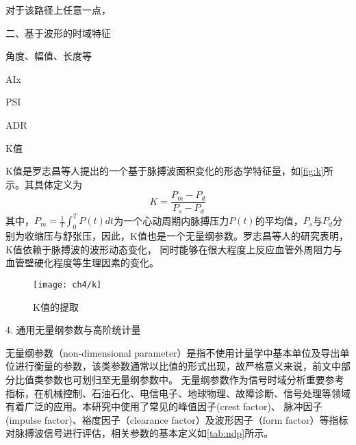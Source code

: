 对于该路径上任意一点，


二、基于波形的时域特征

角度、幅值、长度等

AIx

PSI

ADR

K值

K值是罗志昌等人提出的一个基于脉搏波面积变化的形态学特征量\cite{Luo1988,PPGYY}，如\autoref{fig:k}所示。其具体定义为
\begin{equation}
    \label{equ:ppgk}
    K=\frac{P_m-P_d}{P_s-P_d}
\end{equation}
其中，$P_m=\frac{1}{T}\int_{0}^{T}P(t)dt$为一个心动周期内脉搏压力$P(t)$的平均值，$P_s$与$P_d$分别为收缩压与舒张压，因此，K值也是一个无量纲参数。罗志昌等人的研究表明，K值依赖于脉搏波的波形动态变化，
同时能够在很大程度上反应血管外周阻力与血管壁硬化程度等生理因素的变化。
\begin{figure}[htbp]
    \centering
    \texttt{[image: ch4/k]}
    \caption{\label{fig:k}K值的提取}
\end{figure}


4. 通用无量纲参数与高阶统计量

无量纲参数（non-dimensional parameter）是指不使用计量学中基本单位及导出单位进行衡量的参数，该类参数通常以比值的形式出现，故严格意义来说，前文中部分比值类参数也可划归至无量纲参数中。
无量纲参数作为信号时域分析重要参考指标，在机械控制、石油石化、电信电子、地球物理、故障诊断、信号处理等领域有着广泛的应用\cite{Jardine2006,Guo2014,Tu2013,Mendel1991}。本研究中使用了常见的峰值因子(crest factor)、
脉冲因子(impulse factor)、裕度因子（clearance factor）及波形因子（form factor）等指标对脉搏波信号进行评估，相关参数的基本定义如\autoref{tab:ndp}所示。

